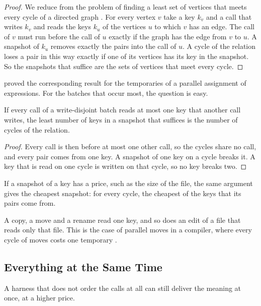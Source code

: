 \documentclass[acmsmall,nonacm,screen]{acmart}
\begin{document}
\begin{proof}
We reduce from the problem of finding a least set of vertices that meets every cycle of a
directed graph \citep{Karp1972}. For every vertex $v$ take a key $k_v$ and a call that
writes $k_v$ and reads the keys $k_u$ of the vertices $u$ to which $v$ has an edge. The call
of $v$ must run before the call of $u$ exactly if the graph has the edge from $v$ to $u$. A
snapshot of $k_u$ removes exactly the pairs into the call of $u$. A cycle of the relation
loses a pair in this way exactly if one of its vertices has its key in the snapshot. So the
snapshots that suffice are the sets of vertices that meet every cycle.
\end{proof}

\citet{Sethi1973} proved the corresponding result for the temporaries of a parallel
assignment of expressions. For the batches that occur most, the question is easy.

\begin{proposition}[Moves]\label{prop:moves}
If every call of a write-disjoint batch reads at most one key that another call writes, the
least number of keys in a snapshot that suffices is the number of cycles of the relation.
\end{proposition}

\begin{proof}
Every call is then before at most one other call, so the cycles share no call, and every
pair comes from one key. A snapshot of one key on a cycle breaks it. A key that is read on
one cycle is written on that cycle, so no key breaks two.
\end{proof}

If a snapshot of a key has a price, such as the size of the file, the same argument gives
the cheapest snapshot: for every cycle, the cheapest of the keys that its pairs come from.

A copy, a move and a rename read one key, and so does an edit of a file that reads only that
file. This is the case of parallel moves in a compiler, where every cycle of moves costs one
temporary \citep{Rideau2008,Boissinot2009}.

\subsection{Everything at the Same Time}

A harness that does not order the calls at all can still deliver the meaning at once, at a
higher price.
\end{document}
